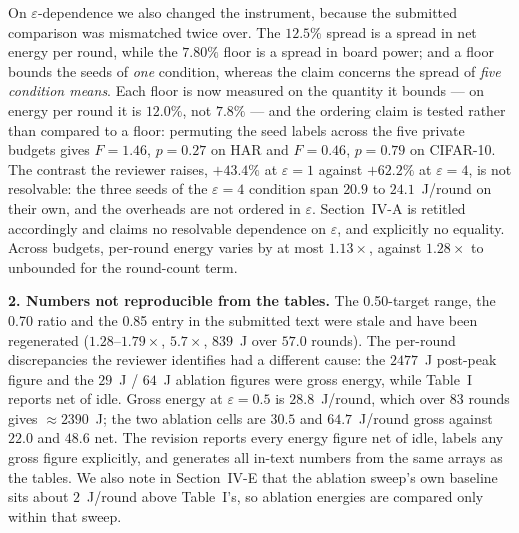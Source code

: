 \documentclass[10pt,a4paper]{article}
\begin{document}
On $\varepsilon$-dependence we also changed the instrument, because the
submitted comparison was mismatched twice over. The $12.5\%$ spread is a spread
in net energy per round, while the $7.80\%$ floor is a spread in board power;
and a floor bounds the seeds of \emph{one} condition, whereas the claim
concerns the spread of \emph{five condition means}. Each floor is now measured
on the quantity it bounds --- on energy per round it is $12.0\%$, not $7.8\%$
--- and the ordering claim is tested rather than compared to a floor: permuting
the seed labels across the five private budgets gives $F = 1.46$, $p = 0.27$ on
HAR and $F = 0.46$, $p = 0.79$ on CIFAR-10. The contrast the reviewer raises,
$+43.4\%$ at $\varepsilon = 1$ against $+62.2\%$ at $\varepsilon = 4$, is not
resolvable: the three seeds of the $\varepsilon = 4$ condition span $20.9$ to
$24.1$~J/round on their own, and the overheads are not ordered in $\varepsilon$.
Section~IV-A is retitled accordingly and claims no resolvable dependence on
$\varepsilon$, and explicitly no equality. Across budgets, per-round energy
varies by at most $1.13\times$, against $1.28\times$ to unbounded for the
round-count term.

\textbf{2. Numbers not reproducible from the tables.} The 0.50-target range,
the 0.70 ratio and the 0.85 entry in the submitted text were stale and have
been regenerated ($1.28$--$1.79\times$, $5.7\times$, $839$~J over $57.0$
rounds). The per-round discrepancies the reviewer identifies had a different
cause: the $2477$~J post-peak figure and the $29$~J / $64$~J ablation figures
were gross energy, while Table~I reports net of idle. Gross energy at
$\varepsilon = 0.5$ is $28.8$~J/round, which over 83 rounds gives
$\approx\!2390$~J; the two ablation cells are $30.5$ and $64.7$~J/round gross
against $22.0$ and $48.6$ net. The revision reports every energy figure net of
idle, labels any gross figure explicitly, and generates all in-text numbers
from the same arrays as the tables. We also note in Section~IV-E that the
ablation sweep's own baseline sits about $2$~J/round above Table~I's, so
ablation energies are compared only within that sweep.
\end{document}
